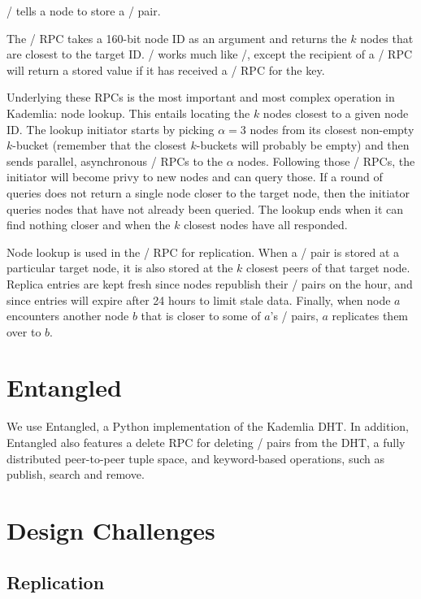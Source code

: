 \documentclass[12pt,twocolumn]{article}
\begin{document}
\store/ tells a node to store a \kv/ pair.

The \findNode/ RPC takes a 160-bit node ID as an argument and returns the $k$ nodes that are closest to the target ID. \findValue/ works much like \findNode/, except the recipient of a \findValue/ RPC will return a stored value if it has received a \store/ RPC for the key.

Underlying these RPCs is the most important and most complex operation in Kademlia: node lookup. This entails locating the $k$ nodes closest to a given node ID. The lookup initiator starts by picking $\alpha = 3$ nodes from its closest non-empty $k$-bucket (remember that the closest $k$-buckets will probably be empty) and then sends parallel, asynchronous \findNode/ RPCs to the $\alpha$ nodes. Following those \findNode/ RPCs, the initiator will become privy to new nodes and can query those. If a round of queries does not return a single node closer to the target node, then the initiator queries nodes that have not already been queried. The lookup ends when it can find nothing closer and when the $k$ closest nodes have all responded.

Node lookup is used in the \store/ RPC for replication. When a \kv/ pair is stored at a particular target node, it is also stored at the $k$ closest peers of that target node. Replica entries are kept fresh since nodes republish their \kv/ pairs on the hour, and since entries will expire after 24 hours to limit stale data. Finally, when node $a$ encounters another node $b$ that is closer to some of $a$'s \kv/ pairs, $a$ replicates them over to $b$.

\section{Entangled}
\newcommand{\delete}{}
\def\delete/{{\sc delete}}
We use Entangled, a Python implementation of the Kademlia DHT.
In addition, Entangled also features a \delete/ RPC for deleting \kv/ pairs from the DHT, a fully distributed peer-to-peer tuple space, and keyword-based operations, such as publish, search and remove.



\section{Design Challenges}
\subsection{Replication}
\end{document}
